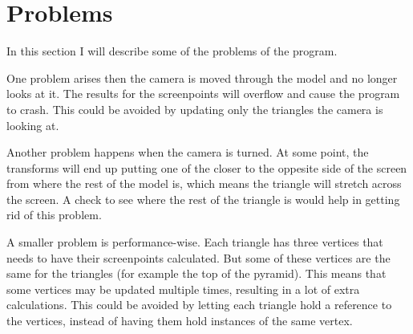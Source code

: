 \section{Problems}
\label{04}

In this section I will describe some of the problems of the program.

One problem arises then the camera is moved through the model and no longer looks at it. The results for the screenpoints will overflow and cause the program to crash. This could be avoided by updating only the triangles the camera is looking at.

Another problem happens when the camera is turned. At some point, the transforms will end up putting one of the closer to the oppesite side of the screen from where the rest of the model is, which means the triangle will stretch across the screen. A check to see where the rest of the triangle is would help in getting rid of this problem.

A smaller problem is performance-wise. Each triangle has three vertices that needs to have their screenpoints calculated. But some of these vertices are the same for the triangles (for example the top of the pyramid). This means that some vertices may be updated multiple times, resulting in a lot of extra calculations. This could be avoided by letting each triangle hold a reference to the vertices, instead of having them hold instances of the same vertex.